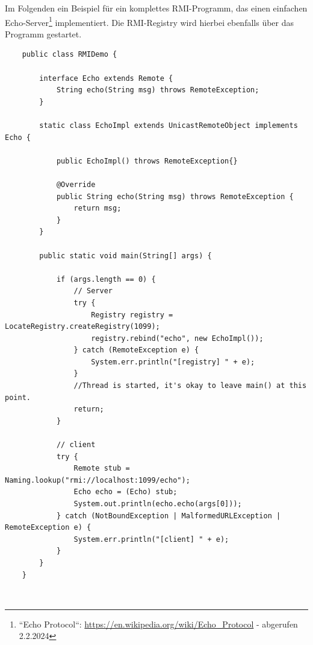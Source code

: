 Im Folgenden ein Beispiel für ein komplettes RMI-Programm, das einen einfachen Echo-Server\footnote{
``Echo Protocol``: \url{https://en.wikipedia.org/wiki/Echo_Protocol} - abgerufen 2.2.2024
} implementiert.
Die RMI-Registry wird hierbei ebenfalls über das Programm gestartet.
\begin{verbatim}
    public class RMIDemo {

        interface Echo extends Remote {
            String echo(String msg) throws RemoteException;
        }

        static class EchoImpl extends UnicastRemoteObject implements Echo {

            public EchoImpl() throws RemoteException{}

            @Override
            public String echo(String msg) throws RemoteException {
                return msg;
            }
        }

        public static void main(String[] args) {

            if (args.length == 0) {
                // Server
                try {
                    Registry registry = LocateRegistry.createRegistry(1099);
                    registry.rebind("echo", new EchoImpl());
                } catch (RemoteException e) {
                    System.err.println("[registry] " + e);
                }
                //Thread is started, it's okay to leave main() at this point.
                return;
            }

            // client
            try {
                Remote stub = Naming.lookup("rmi://localhost:1099/echo");
                Echo echo = (Echo) stub;
                System.out.println(echo.echo(args[0]));
            } catch (NotBoundException | MalformedURLException | RemoteException e) {
                System.err.println("[client] " + e);
            }
        }
    }
\end{verbatim}\\

